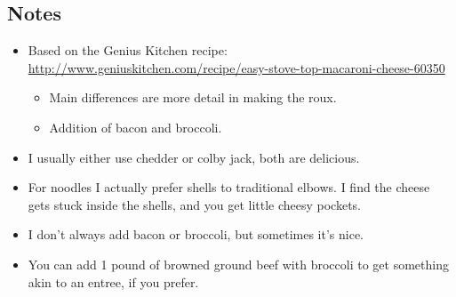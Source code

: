 \begin{multicols}{2}
\subsection*{Notes}
\begin{itemize}
    \item Based on the Genius Kitchen recipe: \url{http://www.geniuskitchen.com/recipe/easy-stove-top-macaroni-cheese-60350}
    \begin{itemize}
        \item Main differences are more detail in making the roux.
        \item Addition of bacon and broccoli.
    \end{itemize}
    \item I usually either use chedder or colby jack, both are delicious.
    \item For noodles I actually prefer shells to traditional elbows. I find the cheese gets stuck inside the shells, and you get little cheesy pockets.
    \item I don't always add bacon or broccoli, but sometimes it's nice.
    \item You can add 1 pound of browned ground beef with broccoli to get something akin to an entree, if you prefer.
\end{itemize}
\end{multicols}
\clearpage